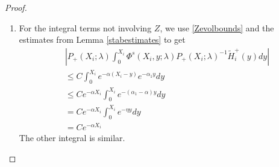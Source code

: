 \documentclass[thesis.tex]{subfiles}
\begin{document}
\begin{lemma}
\begin{proof}
\begin{enumerate}
\item For the integral terms not involving $Z$, we use \eqref{Zevolbounds} and the estimates from Lemma \ref{stabestimates} to get
\begin{align*}
&\left|
P_+(X_i; \lambda) \int_0^{X_i} \Phi^s(X_i, y; \lambda) P_+(X_i; \lambda)^{-1} \tilde{H}_i^+(y) dy \right| \\
&\leq C \int_0^{X_i} e^{-\alpha(X_i - y)}e^{-\alpha_1 y} dy \\
&\leq C e^{-\alpha X_i} \int_0^{X_i} e^{-(\alpha_1 - \alpha)y} dy \\
&= C e^{-\alpha X_i} \int_0^{X_i} e^{-\eta y} dy \\ 
&= C e^{-\alpha X_i}
\end{align*}
The other integral is similar.
\end{enumerate}


\end{proof}
\end{lemma}
\end{document}
